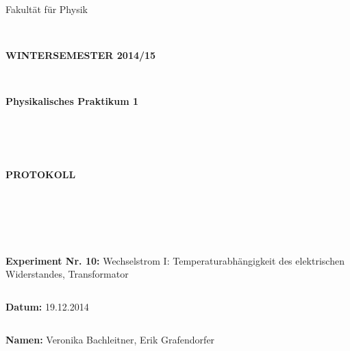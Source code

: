 \documentclass{article}
\begin{document}
\thispagestyle{empty}
			\begin{center}
			\Large{Fakultät für Physik}\\
			\end{center}
\begin{verbatim}


\end{verbatim}
			\begin{center}
			\textbf{\LARGE WINTERSEMESTER 2014/15}
			\end{center}
\begin{verbatim}


\end{verbatim}
			\begin{center}
			\textbf{\LARGE{Physikalisches Praktikum 1}}
			\end{center}
\begin{verbatim}




\end{verbatim}

			\begin{center}
			\textbf{\LARGE{PROTOKOLL}}
			\end{center}
			
\begin{verbatim}





\end{verbatim}

			\begin{flushleft}
			\textbf{\Large{Experiment Nr. 10:}} \Large{Wechselstrom I:
Temperaturabhängigkeit des elektrischen Widerstandes,
Transformator}\\
			\LARGE{}	
			\end{flushleft}

\begin{verbatim}

\end{verbatim}	
			\begin{flushleft}
			\textbf{\Large{Datum:}} \Large{19.12.2014}
			\end{flushleft}
			
\begin{verbatim}
\end{verbatim}
		\begin{flushleft}
			\textbf{\Large{Namen:}} \Large{Veronika Bachleitner, Erik Grafendorfer}
			\end{flushleft}
\end{document}
